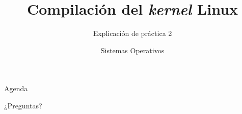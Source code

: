 


\title{Compilación del \textit{kernel} Linux}
\author{Sistemas Operativos}
\subtitle{Explicación de práctica 2}



\begin{frame}
  \titlepage
\end{frame}

\begin{frame}{Agenda}
  \tableofcontents
\end{frame}



\begin{frame}{}
  \begin{center}
    \vfill
    \huge ¿Preguntas?
    \vfill
  \end{center}
\end{frame}


